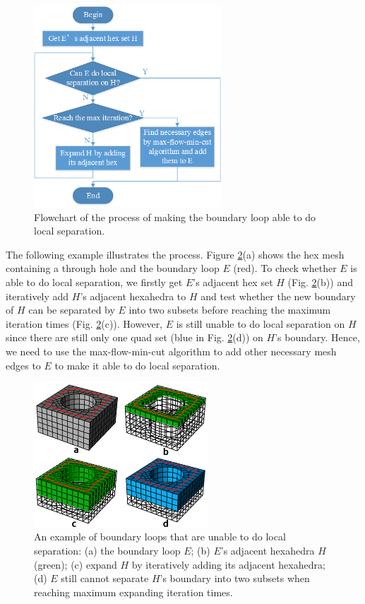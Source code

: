 \documentclass[final,5p,times,twocolumn]{elsarticle}
\begin{document}
\begin{figure}[htbp]
\begin{center}
\includegraphics[width=7cm]{flow_local_separation.png}
\caption{Flowchart of the process of making the boundary loop able to do local separation.}
\label{fig:flow_local_sep}
\end{center}
\end{figure}

The following example illustrates the process. Figure \ref{fig:local_sep_exam}(a) shows the hex mesh containing a through hole and the boundary loop $E$ (red). To check whether $E$ is able to do local separation, we firstly get $E$'s adjacent hex set $H$ (Fig. \ref{fig:local_sep_exam}(b)) and iteratively add $H$'s adjacent hexahedra to $H$ and test whether the new boundary of $H$ can be separated by $E$ into two subsets before reaching the maximum iteration times (Fig. \ref{fig:local_sep_exam}(c)). However, $E$ is still unable to do local separation on $H$ since there are still only one quad set (blue in Fig. \ref{fig:local_sep_exam}(d)) on $H$'s boundary. Hence, we need to use the max-flow-min-cut algorithm to add other necessary mesh edges to $E$ to make it able to do local separation.

\begin{figure}[htbp]
\begin{center}
\includegraphics[width=6.5cm]{local_sep_exam.png}
\caption{An example of boundary loops that are unable to do local separation: (a) the boundary loop $E$; (b) $E$'s adjacent hexahedra $H$(green); (c) expand $H$ by iteratively adding its adjacent hexahedra; (d) $E$ still cannot separate $H$'s boundary into two subsets when reaching maximum expanding iteration times.}
\label{fig:local_sep_exam}
\end{center}
\end{figure}
\end{document}
